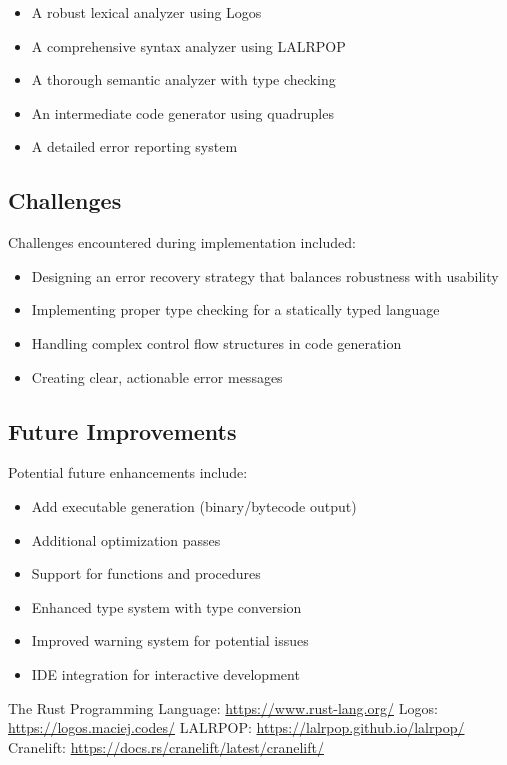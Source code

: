 \documentclass[12pt,a4paper]{article}
\begin{document}
\begin{itemize}
	\item A robust lexical analyzer using Logos
	\item A comprehensive syntax analyzer using LALRPOP
	\item A thorough semantic analyzer with type checking
	\item An intermediate code generator using quadruples
	\item A detailed error reporting system
\end{itemize}

\subsection{Challenges}
Challenges encountered during implementation included:
\begin{itemize}
	\item Designing an error recovery strategy that balances robustness with usability
	\item Implementing proper type checking for a statically typed language
	\item Handling complex control flow structures in code generation
	\item Creating clear, actionable error messages
\end{itemize}

\subsection{Future Improvements}
Potential future enhancements include:
\begin{itemize}
    \item Add executable generation (binary/bytecode output)
	\item Additional optimization passes
	\item Support for functions and procedures
	\item Enhanced type system with type conversion
	\item Improved warning system for potential issues
	\item IDE integration for interactive development
\end{itemize}


\begin{thebibliography}{9}
	 The Rust Programming Language: \url{https://www.rust-lang.org/}
	 Logos: \url{https://logos.maciej.codes/}
	 LALRPOP: \url{https://lalrpop.github.io/lalrpop/}
	 Cranelift: \url{https://docs.rs/cranelift/latest/cranelift/}
\end{thebibliography}
\end{document}
